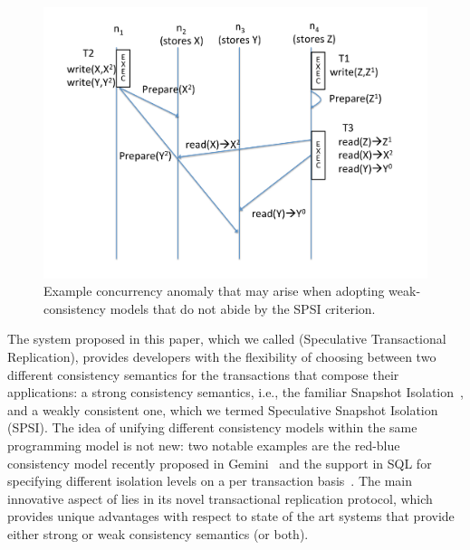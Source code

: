 \begin{figure}
\centering
\includegraphics[scale = 0.24]{figures/example.pdf}
\caption{\footnotesize Example concurrency anomaly that may arise when adopting weak-consistency models that do not abide by the SPSI criterion.}
\label{fig:example}
\end{figure}

The system proposed in this paper, which we called \specula (Speculative Transactional Replication), provides developers with the flexibility of choosing between two different consistency semantics for the transactions that compose their applications: a strong consistency semantics, i.e., the familiar Snapshot Isolation~\cite{berenson1995critique}, and a weakly consistent one, which we termed Speculative Snapshot Isolation (SPSI). The idea of unifying different consistency models within the same programming model is not new: two notable examples are the red-blue consistency model recently proposed in Gemini~\cite{li2012making} and the support in SQL for specifying different isolation levels on a per transaction basis~\cite{sqk}.  The main innovative aspect of \specula lies in its novel transactional replication protocol, which provides unique advantages with respect to state of the art systems that provide either strong or weak consistency semantics (or both).

